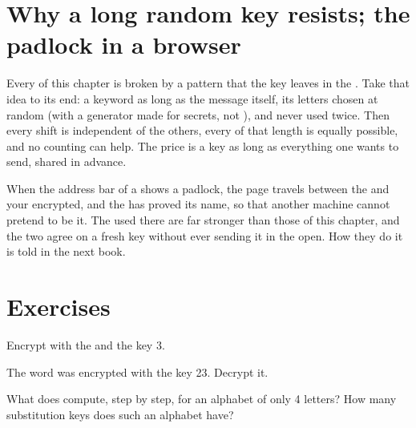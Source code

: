 \section{Why a long random key resists; the padlock in a browser}

Every  of this chapter is broken by a pattern that the key leaves in the
. Take that idea to its end: a keyword as long as the message itself,
its letters chosen at random (with a generator made for secrets, not
), and never used twice. Then every shift is independent of the
others, every  of that length is equally possible, and no counting can
help. The price is a key as long as everything one wants to send, shared in
advance.

When the address bar of a  shows a padlock, the page travels between the
 and your  encrypted, and the  has proved its name, so that
another machine cannot pretend to be it. The  used there are far
stronger than those of this chapter, and the two  agree on a fresh key
without ever sending it in the open. How they do it is told in the next book.

\section{Exercises}

\begin{exercise}[$\star$]\label{exo:g9:first-cryptography:1}
Encrypt  with the  and the key 3.
\end{exercise}

\begin{exercise}[$\star$]\label{exo:g9:first-cryptography:2}
The word  was encrypted with the key 23. Decrypt it.
\end{exercise}

\begin{exercise}[$\star$]\label{exo:g9:first-cryptography:3}
What does  compute, step by step, for an alphabet of only
4 letters? How many substitution keys does such an alphabet have?
\end{exercise}

